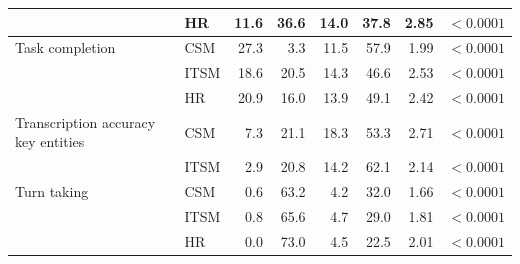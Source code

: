 \begin{longtable}{>{\raggedright\arraybackslash}p{1.8cm}lrrrrrr}
 & HR & 11.6 & 36.6 & 14.0 & 37.8 & 2.85 & $< 0.0001$ \\
\midrule
Task completion & CSM & 27.3 & 3.3 & 11.5 & 57.9 & 1.99 & $< 0.0001$ \\
 & ITSM & 18.6 & 20.5 & 14.3 & 46.6 & 2.53 & $< 0.0001$ \\
 & HR & 20.9 & 16.0 & 13.9 & 49.1 & 2.42 & $< 0.0001$ \\
\midrule
Transcription accuracy key entities & CSM & 7.3 & 21.1 & 18.3 & 53.3 & 2.71 & $< 0.0001$ \\
 & ITSM & 2.9 & 20.8 & 14.2 & 62.1 & 2.14 & $< 0.0001$ \\
\midrule
Turn taking & CSM & 0.6 & 63.2 & 4.2 & 32.0 & 1.66 & $< 0.0001$ \\
 & ITSM & 0.8 & 65.6 & 4.7 & 29.0 & 1.81 & $< 0.0001$ \\
 & HR & 0.0 & 73.0 & 4.5 & 22.5 & 2.01 & $< 0.0001$ \\
\end{longtable}
\endgroup